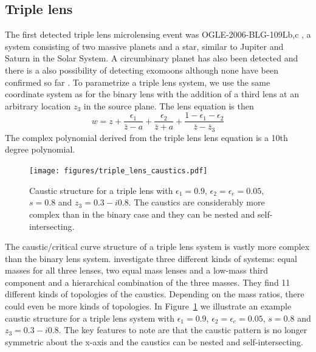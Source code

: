\documentclass[12pt]{report}
\begin{document}
\subsection{Triple lens}
The first detected triple lens microlensing event was OGLE-2006-BLG-109Lb,c
\citep{2008Sci...319..927G,2010ApJ...713..837B}, a system consisting of two
massive planets and a star, similar to Jupiter and Saturn in the Solar System.
A circumbinary planet has also been detected \citep{2016AJ....152..125B} and
there is a also possibility of detecting exomoons although none have been
confirmed so far \citep{2010A&A...520A..68L}. To parametrize a triple lens
system, we use the same coordinate system as for the binary lens with the
addition of a third lens at an arbitrary location $z_3$ in the source plane.
The lens equation is then
\begin{equation}
    w=z+\frac{\epsilon_{1}}{\bar{z} - a}+\frac{\epsilon_{2}}{\bar{z} + a} +
    \frac{1 - \epsilon_1 - \epsilon_2}{\bar{z} - \bar{z}_3}
\end{equation}
The complex polynomial derived from the triple lens lens equation is a 10th degree
polynomial.

\begin{figure}[t]
    \centering
    \texttt{[image: figures/triple\_lens\_caustics.pdf]}
    \caption{Caustic structure for a triple lens with
        $\epsilon_1=0.9$, $\epsilon_2=\epsilon_e=0.05$, $s=0.8$ and $z_3=0.3-i0.8$.
        The caustics are considerably more complex than in the binary case and they
        can be nested and self-intersecting.
    }
    \label{fig:triple_lens_caustics}
\end{figure}

The caustic/critical curve structure of a triple lens system is vastly more
complex than the binary lens system. \citet{2019ApJ...880...72D} investigate
three different kinds of systems: equal masses for all three lenses, two equal
mass lenses and a low-mass third component and a hierarchical combination of
the three masses. They find 11 different kinds of topologies of the caustics.
Depending on the mass ratios, there could even be more kinds of topologies. In
Figure~\ref{fig:triple_lens_caustics} we illustrate an example caustic
structure for a triple lens system with $\epsilon_1=0.9$,
$\epsilon_2=\epsilon_e=0.05$, $s=0.8$ and $z_3=0.3-i0.8$. The key features to
note are that the caustic pattern is no longer symmetric about the x-axis and
the caustics can be nested and self-intersecting.
\end{document}
